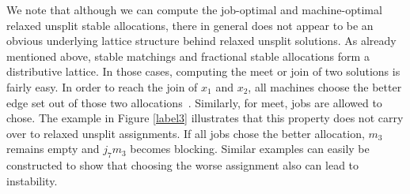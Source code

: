 \documentclass{llncs}
\begin{document}
We note that although we can compute the job-optimal and
machine-optimal relaxed unsplit stable allocations, there in general
does not appear to be an obvious underlying lattice structure behind
relaxed unsplit solutions.  As already mentioned above, stable
matchings and fractional stable allocations form a distributive
lattice. In those cases, computing the meet or join of two solutions
is fairly easy. In order to reach the join of $x_1$ and $x_2$, all
machines choose the better edge set out of those two
allocations~\cite{egres-09-11}. Similarly, for meet, 
jobs are allowed to chose.  The example in Figure \ref{label3}
illustrates that this property does not carry over to relaxed unsplit
assignments. If all jobs chose the better allocation, $m_3$ remains
empty and $j_7m_3$ becomes blocking. Similar examples can easily be
constructed to show that choosing the worse assignment also can lead
to instability.
\end{document}
